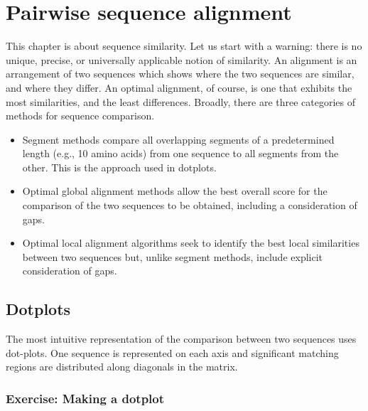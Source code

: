 \documentclass[12pt]{report}
\begin{document}
\chapter{Pairwise sequence alignment}

This chapter is about sequence similarity.  Let us start with a
warning: there is no unique, precise, or universally applicable notion
of similarity. An alignment is an arrangement of two sequences which
shows where the two sequences are similar, and where they differ.  An
optimal alignment, of course, is one that exhibits the most
similarities, and the least differences. Broadly, there are three
categories of methods for sequence comparison.

\begin{itemize}
\item Segment methods compare all overlapping segments of a predetermined
length (e.g., 10 amino acids) from one sequence to all segments from
the other. This is the approach used in dotplots.
\item Optimal global alignment methods allow the best overall score for the comparison of
the two sequences to be obtained, including a consideration of gaps.
\item Optimal local alignment algorithms seek to identify the best local 
similarities between two sequences but,
unlike segment methods, include explicit consideration of gaps.  
\end{itemize}

\section{Dotplots}
The most intuitive representation of the comparison between two
sequences uses dot-plots. One sequence is represented on each axis
and significant matching regions are distributed along diagonals
in the matrix.

\subsection*{Exercise: Making a dotplot}

\unix{}\\
\\
\\
\\
\\
\\
\end{document}
